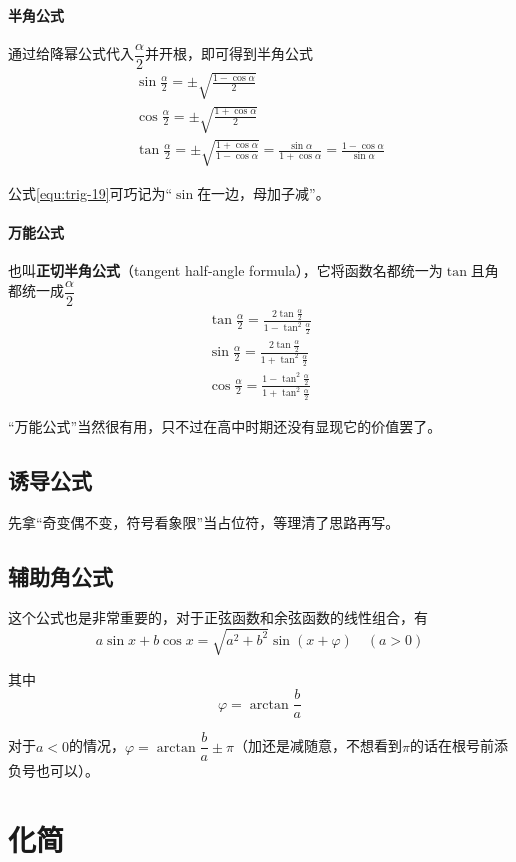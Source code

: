 \paragraph{半角公式}
通过给降幂公式代入$\dfrac{\alpha}{2}$并开根，即可得到半角公式
\begin{gather}
    \sin\frac{\alpha}{2}=\pm\sqrt{\frac{1-\cos\alpha}{2}} \label{equ:trig-17} \\
    \cos\frac{\alpha}{2}=\pm\sqrt{\frac{1+\cos\alpha}{2}} \label{equ:trig-18} \\
    \tan\frac{\alpha}{2}=\pm\sqrt{\frac{1+\cos\alpha}{1-\cos\alpha}}=\frac{\sin\alpha}{1+\cos\alpha}=\frac{1-\cos\alpha}{\sin\alpha} \label{equ:trig-19}
\end{gather}

公式\eqref{equ:trig-19}可巧记为“$\sin$在一边，母加子减”。

\paragraph{万能公式}
也叫\textbf{正切半角公式}（tangent half-angle formula），它将函数名都统一为$\tan$且角都统一成$\dfrac{\alpha}{2}$
\begin{gather}
    \tan\frac{\alpha}{2}=\frac{2\tan\frac{\alpha}{2}}{1-\tan^2\frac{\alpha}{2}} \label{equ:trig-20} \\
    \sin\frac{\alpha}{2}=\frac{2\tan\frac{\alpha}{2}}{1+\tan^2\frac{\alpha}{2}} \label{equ:trig-21} \\
    \cos\frac{\alpha}{2}=\frac{1-\tan^2\frac{\alpha}{2}}{1+\tan^2\frac{\alpha}{2}} \label{equ:trig-22}
\end{gather}

“万能公式”当然很有用，只不过在高中时期还没有显现它的价值罢了。

\subsection{诱导公式}
先拿“奇变偶不变，符号看象限”当占位符，等理清了思路再写。

\subsection{辅助角公式}
这个公式也是非常重要的，对于正弦函数和余弦函数的线性组合，有\[a\sin x+b\cos x=\sqrt{a^2+b^2}\sin(x+\varphi)\quad(a>0)\]

其中\[\varphi=\arctan\frac{b}{a}\]

对于$a<0$的情况，$\varphi=\arctan\dfrac{b}{a}\pm\pi$（加还是减随意，不想看到$\pi$的话在根号前添负号也可以）。

\section{化简}
